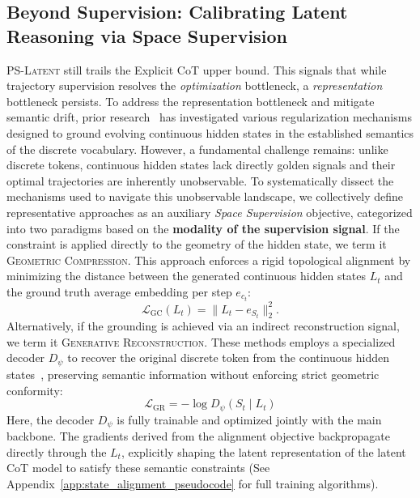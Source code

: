 \subsection{Beyond Supervision: Calibrating Latent Reasoning via Space Supervision}
\label{subsec:statealign}
\textsc{PS-Latent} still trails the Explicit CoT upper bound. This signals that while trajectory supervision resolves the \textit{optimization} bottleneck, a \textit{representation} bottleneck persists.
To address the representation bottleneck and mitigate semantic drift, prior research~\citep{shen-etal-2025-codi, colar, ccot} has investigated various regularization mechanisms designed to ground evolving continuous hidden states in the established semantics of the discrete vocabulary. 
However, a fundamental challenge remains: unlike discrete tokens, continuous hidden states lack directly golden signals and their optimal trajectories are inherently unobservable.
To systematically dissect the mechanisms used to navigate this unobservable landscape, we collectively define representative approaches as an auxiliary \textit{Space Supervision} objective, categorized into two paradigms based on the \textbf{modality of the supervision signal}.
If the constraint is applied directly to the geometry of the hidden state, we term it \textsc{Geometric Compression}. This approach enforces a rigid topological alignment by minimizing the distance between the generated continuous hidden states $L_t$ and the ground truth average embedding per step $e_{c_t}$:
\begin{equation}
    \mathcal{L}_{\text{GC}}(L_t)
    =
    \| L_t - e_{S_t} \|_2^2.
\end{equation}
Alternatively, if the grounding is achieved via an indirect reconstruction signal, we term it \textsc{Generative Reconstruction}. These methods employs a specialized decoder $D_{\psi}$ to recover the original discrete token from the continuous hidden states~\citep{simcot, he2025semcot}, preserving semantic information without enforcing strict geometric conformity:
\begin{equation}
    \mathcal{L}_{\text{GR}} = - \log D_{\psi}(S_t \mid L_t)
\end{equation}
Here, the decoder $D_{\psi}$ is fully trainable and optimized jointly with the main backbone. The gradients derived from the alignment objective backpropagate directly through the $L_t$, explicitly shaping the latent representation of the latent CoT model to satisfy these semantic constraints (See Appendix~\ref{app:state_alignment_pseudocode} for full training algorithms).

